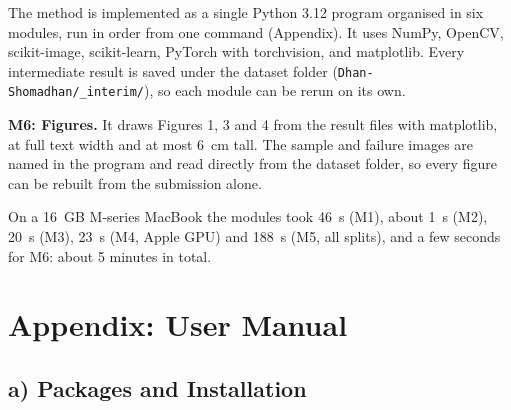 

The method is implemented as a single Python 3.12 program organised in six
modules, run in order from one command (Appendix). It uses NumPy, OpenCV,
scikit-image, scikit-learn, PyTorch with torchvision, and matplotlib. Every
intermediate result is saved under the dataset folder
(\texttt{Dhan-Shomadhan/\_interim/}), so each module can be rerun on its own.


\textbf{M6: Figures.} It draws Figures 1, 3 and 4 from the result files with
matplotlib, at full text width and at most 6~cm tall. The sample and failure
images are named in the program and read directly from the dataset folder, so
every figure can be rebuilt from the submission alone.

On a 16~GB M-series MacBook the modules took 46~s (M1), about 1~s (M2),
20~s (M3), 23~s (M4, Apple GPU) and 188~s (M5, all splits), and a few seconds
for M6: about 5 minutes in total.



\section{Appendix: User Manual}

\subsection*{a) Packages and Installation}

